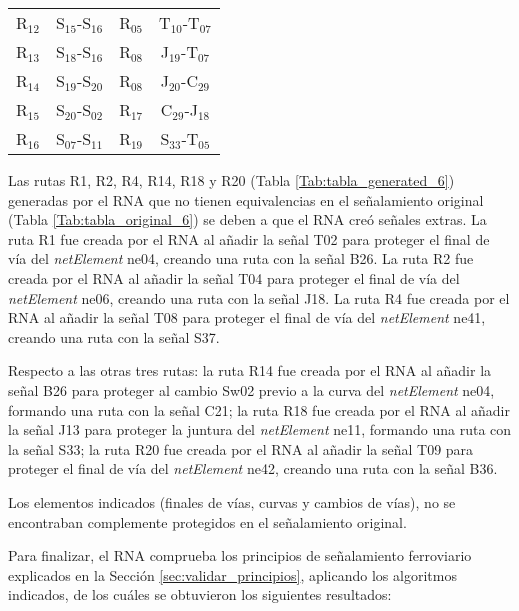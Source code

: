 \begin{table}[H]
{\begin{center}
{\begin{tabular}{ c c c c }
	                R$_{12}$ & S$_{15}$-S$_{16}$ & R$_{05}$ & T$_{10}$-T$_{07}$ \\
	                R$_{13}$ & S$_{18}$-S$_{16}$ & R$_{08}$ & J$_{19}$-T$_{07}$ \\
	                R$_{14}$ & S$_{19}$-S$_{20}$ & R$_{08}$ & J$_{20}$-C$_{29}$ \\
	                R$_{15}$ & S$_{20}$-S$_{02}$ & R$_{17}$ & C$_{29}$-J$_{18}$ \\
	                R$_{16}$ & S$_{07}$-S$_{11}$ & R$_{19}$ & S$_{33}$-T$_{05}$ \\
	            \hline
	        \end{tabular}
		}
		\end{center}
    }    
    \end{table}
    
    Las rutas R1, R2, R4, R14, R18 y R20 (Tabla \ref{Tab:tabla_generated_6}) generadas por el RNA que no tienen equivalencias en el señalamiento original (Tabla \ref{Tab:tabla_original_6}) se deben a que el RNA creó señales extras. La ruta R1 fue creada por el RNA al añadir la señal T02 para proteger el final de vía del \textit{netElement} ne04, creando una ruta con la señal B26. La ruta R2 fue creada por el RNA al añadir la señal T04 para proteger el final de vía del \textit{netElement} ne06, creando una ruta con la señal J18. La ruta R4 fue creada por el RNA al añadir la señal T08 para proteger el final de vía del \textit{netElement} ne41, creando una ruta con la señal S37.
    
    Respecto a las otras tres rutas: la ruta R14 fue creada por el RNA al añadir la señal B26 para proteger al cambio Sw02 previo a la curva del \textit{netElement} ne04, formando una ruta con la señal C21; la ruta R18 fue creada por el RNA al añadir la señal J13 para proteger la juntura  del \textit{netElement} ne11, formando una ruta con la señal S33; la ruta R20 fue creada por el RNA al añadir la señal T09 para proteger el final de vía del \textit{netElement} ne42, creando una ruta con la señal B36.
    
    Los elementos indicados (finales de vías, curvas y cambios de vías), no se encontraban complemente protegidos en el señalamiento original.
    
    Para finalizar, el RNA comprueba los principios de señalamiento ferroviario explicados en la Sección \ref{sec:validar_principios}, aplicando los algoritmos indicados, de los cuáles se obtuvieron los siguientes resultados:
    
